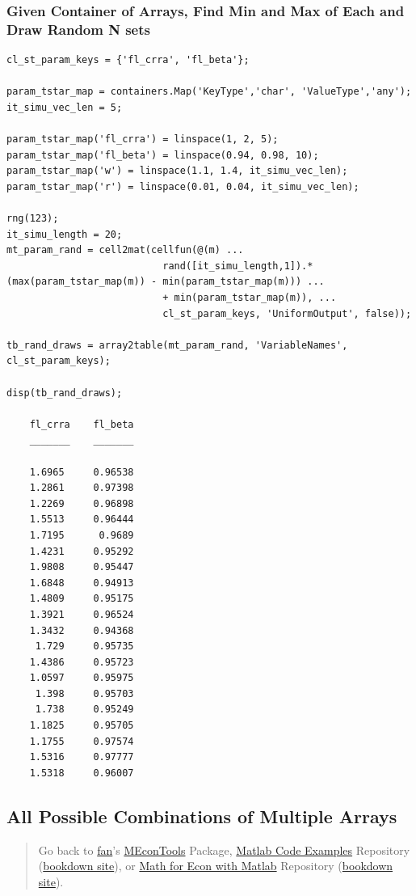 \documentclass[
]{book}
\begin{document}
\hypertarget{given-container-of-arrays-find-min-and-max-of-each-and-draw-random-n-sets}{%
\subsubsection{Given Container of Arrays, Find Min and Max of Each and Draw Random N sets}\label{given-container-of-arrays-find-min-and-max-of-each-and-draw-random-n-sets}}

\begin{verbatim}
cl_st_param_keys = {'fl_crra', 'fl_beta'};

param_tstar_map = containers.Map('KeyType','char', 'ValueType','any');
it_simu_vec_len = 5;

param_tstar_map('fl_crra') = linspace(1, 2, 5);
param_tstar_map('fl_beta') = linspace(0.94, 0.98, 10);
param_tstar_map('w') = linspace(1.1, 1.4, it_simu_vec_len);
param_tstar_map('r') = linspace(0.01, 0.04, it_simu_vec_len);

rng(123);
it_simu_length = 20;
mt_param_rand = cell2mat(cellfun(@(m) ...
                           rand([it_simu_length,1]).*(max(param_tstar_map(m)) - min(param_tstar_map(m))) ...
                           + min(param_tstar_map(m)), ...
                           cl_st_param_keys, 'UniformOutput', false));

tb_rand_draws = array2table(mt_param_rand, 'VariableNames', cl_st_param_keys);

disp(tb_rand_draws);

    fl_crra    fl_beta
    _______    _______

    1.6965     0.96538
    1.2861     0.97398
    1.2269     0.96898
    1.5513     0.96444
    1.7195      0.9689
    1.4231     0.95292
    1.9808     0.95447
    1.6848     0.94913
    1.4809     0.95175
    1.3921     0.96524
    1.3432     0.94368
     1.729     0.95735
    1.4386     0.95723
    1.0597     0.95975
     1.398     0.95703
     1.738     0.95249
    1.1825     0.95705
    1.1755     0.97574
    1.5316     0.97777
    1.5318     0.96007
\end{verbatim}

\hypertarget{all-possible-combinations-of-multiple-arrays}{%
\subsection{All Possible Combinations of Multiple Arrays}\label{all-possible-combinations-of-multiple-arrays}}

\begin{quote}
Go back to \href{http://fanwangecon.github.io/}{fan}'s \href{https://fanwangecon.github.io/MEconTools/}{MEconTools} Package, \href{https://fanwangecon.github.io/M4Econ/}{Matlab Code Examples} Repository (\href{https://fanwangecon.github.io/M4Econ/bookdown}{bookdown site}), or \href{https://fanwangecon.github.io/Math4Econ/}{Math for Econ with Matlab} Repository (\href{https://fanwangecon.github.io/Math4Econ/bookdown}{bookdown site}).
\end{quote}
\end{document}
